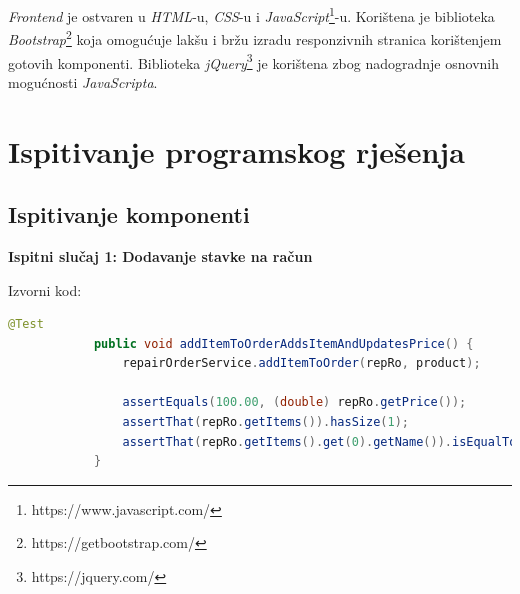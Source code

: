 		\textit{Frontend} je ostvaren u \textit{HTML}-u, \textit{CSS}-u i \textit{JavaScript}\footnote{https://www.javascript.com/}-u. Korištena je biblioteka \textit{Bootstrap}\footnote{https://getbootstrap.com/} koja omogućuje lakšu i bržu izradu responzivnih stranica korištenjem gotovih komponenti. Biblioteka \textit{jQuery}\footnote{https://jquery.com/} je korištena zbog nadogradnje osnovnih mogućnosti \textit{JavaScripta}.
			
			\eject 
		
	
		\section{Ispitivanje programskog rješenja}
			
			
	
			
			\subsection{Ispitivanje komponenti}
			
			\hfill\break
			\noindent\textbf{Ispitni slučaj 1: Dodavanje stavke na račun}
			
			\noindent Izvorni kod:
			
			\begin{lstlisting}[language=Java]
			@Test
			public void addItemToOrderAddsItemAndUpdatesPrice() {
				repairOrderService.addItemToOrder(repRo, product);
			
				assertEquals(100.00, (double) repRo.getPrice());
				assertThat(repRo.getItems()).hasSize(1);
				assertThat(repRo.getItems().get(0).getName()).isEqualTo("Item");
			}
			\end{lstlisting}
			
